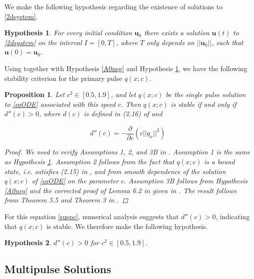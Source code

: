 \documentclass[12pt]{article}
\newtheorem{proposition}{Proposition}
\newtheorem{hypothesis}{Hypothesis}
\begin{document}
We make the following hypothesis regarding the existence of solutions to \eqref{2dsystem}.

\begin{hypothesis}\label{existhyp}
For every initial condition $\textbf{u}_0$ there exists a solution $\textbf{u}(t)$ to \eqref{2dsystem} on the interval $I = [0, T]$, where $T$ only depends on $||\textbf{u}_0||$, such that $\textbf{u}(0) = \textbf{u}_0$. 
\end{hypothesis}

Using \cite{Grillakis1987} together with Hypothesis \ref{A0neg} and Hypothesis \ref{existhyp}, we have the following stability criterion for the primary pulse $q(x; c)$. 

\begin{proposition}\label{stabcrit}
Let $c^2 \in [0.5, 1.9]$, and let $q(x; c)$ be the single pulse solution to \eqref{eqODE} associated with this speed $c$. Then $q(x; c)$ is stable if and only if $d''(c) > 0$, where $d(c)$ is defined in (2.16) of \cite{Grillakis1987} and 

\begin{equation}\label{dcc}
d''(c) = -\frac{\partial}{\partial c} \left( c ||q_x||^2 \right)
\end{equation}

\begin{proof}
We need to verify Assumptions 1, 2, and 3B in \cite{Grillakis1987}. Assumption 1 is the same as Hypothesis \ref{existhyp}. Assumption 2 follows from the fact that $q(x; c)$ is a bound state, i.e. satisfies (2.15) in \cite{Grillakis1987}, and from smooth dependence of the solution $q(x; c)$ of \eqref{eqODE} on the parameter $c$. Assumption 3B follows from Hypothesis \ref{A0neg} and the corrected proof of Lemma 6.2 in \cite{Grillakis1987} given in \cite{Grillakis1990}. The result follows from Theorem 5.5 and Theorem 3 in \cite{Grillakis1987}.

\end{proof}
\end{proposition}

For this equation \eqref{suspc}, numerical analysis suggests that $d''(c) > 0$, indicating that $q(x; c)$ is stable. We therefore make the following hypothesis.

\begin{hypothesis}\label{hyp_dccpos}
$d''(c) > 0$ for $c^2 \in [0.5, 1.9]$.
\end{hypothesis}

\subsection{Multipulse Solutions}
\end{document}
